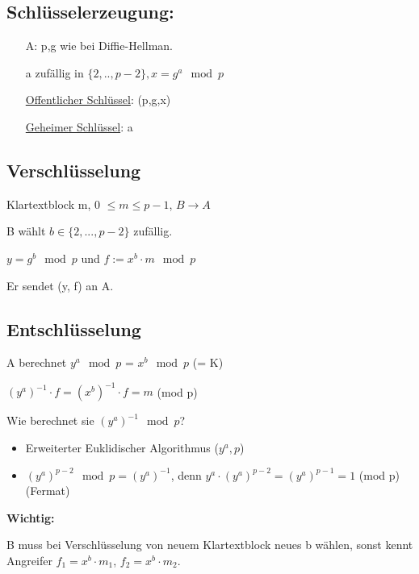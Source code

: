   \subsection{Schlüsselerzeugung:}

  \begin{itemize}
    \item[A:] p,g wie bei Diffie-Hellman.

    a zufällig in $\{2,..,p-2\}, x = g^a \mod p$

    \underline{Offentlicher Schlüssel}: (p,g,x) 

    \underline{Geheimer Schlüssel}: a 
  \end{itemize}

  \subsection{Verschlüsselung}

  Klartextblock m, 0 $\le m \le p-1$, $B \longrightarrow A$

  B wählt $b \in \{2,...,p-2\}$ zufällig.

  $y = g^b \mod p$ und $f := x^b \cdot m \mod p$

  \par \medskip

  Er sendet (y, f) an A.

  \subsection{Entschlüsselung}

  A berechnet $y^a \mod p$ = $x^b \mod p$ (= K)

  $(y^a)^{-1} \cdot f = (x^b)^{-1} \cdot f = m$ (mod p)

  \par \medskip

  Wie berechnet sie $(y^a)^{-1} \mod p$?

  \begin{itemize}
    \item Erweiterter Euklidischer Algorithmus ($y^a, p$)
    \item $(y^a)^{p-2} \mod p = (y^a)^{-1}$, denn $y^a \cdot (y^a)^{p-2} = (y^a)^{p-1} = 1$ (mod p) (Fermat)
  \end{itemize}

  \textbf{Wichtig:}

  B muss bei Verschlüsselung von neuem Klartextblock neues b wählen, sonst kennt Angreifer $f_1 = x^b \cdot m_1$, $f_2 = x^b \cdot m_2$.

